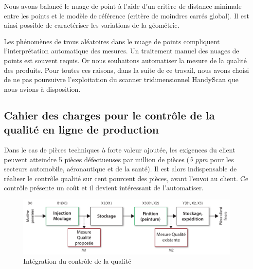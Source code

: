 Nous avons balancé le nuage de point à l'aide d'un critère de distance minimale entre les points et le modèle de référence (critère de moindres carrés global).
Il est ainsi possible de caractériser les variations de la géométrie.

Les phénomènes de trous aléatoires dans le nuage de points compliquent l'interprétation automatique des mesures.
Un traitement manuel des nuages de points est souvent requis.
Or nous souhaitons automatiser la mesure de la qualité des produits.
Pour toutes ces raisons, dans la suite de ce travail, nous avons choisi de ne pas poursuivre l'exploitation du scanner tridimensionnel HandyScan que nous avions à disposition.

\subsection{Cahier des charges pour le contrôle de la qualité en ligne de production}
Dans le cas de pièces techniques à forte valeur ajoutée, les exigences du client peuvent atteindre 5 pièces défectueuses par million de pièces (\textit{5 ppm} pour les secteurs automobile, aéronautique et de la santé).
Il est alors indispensable de réaliser le contrôle qualité sur cent pourcent des pièces, avant l'envoi au client.
Ce contrôle présente un coût et il devient intéressant de l'automatiser.

\begin{figure}[htbp]
	\centering
	\includegraphics[width=\textwidth]{../Chap2/Figures/integration_controle_qualite.pdf}
	\caption{Intégration du contrôle de la qualité}
	\label{fig:quality_integration}
\end{figure}

